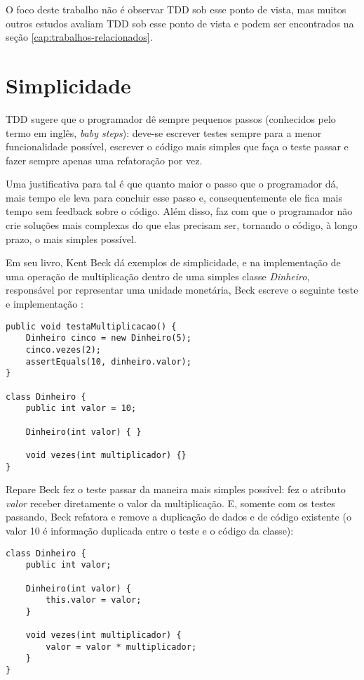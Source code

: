 O foco deste trabalho não é observar TDD sob esse ponto de vista, mas muitos
outros estudos avaliam TDD sob esse ponto de vista e podem ser encontrados na
seção \ref{cap:trabalhos-relacionados}.

\section{Simplicidade}

TDD sugere que o programador dê sempre pequenos passos (conhecidos pelo termo em
inglês, \textit{baby steps}): deve-se escrever testes sempre para a menor
funcionalidade possível, escrever o código mais simples que faça o teste passar
e fazer sempre apenas uma refatoração por vez.

Uma justificativa para tal é que quanto maior o passo que o programador dá, mais
tempo ele leva para concluir esse passo e, consequentemente ele fica mais tempo
sem feedback sobre o código. Além disso, faz com que o programador não crie
soluções mais complexas do que elas precisam ser, tornando o código, à longo
prazo, o mais simples possível.

Em seu livro, Kent Beck dá exemplos de simplicidade, e na implementação de uma
operação de multiplicação dentro de uma simples classe \textit{Dinheiro},
responsável por representar uma unidade monetária, Beck escreve o seguinte
teste e implementação \cite{TDDByExample}:

\begin{lstlisting}[frame=trbl]
public void testaMultiplicacao() {
	Dinheiro cinco = new Dinheiro(5);
	cinco.vezes(2);
	assertEquals(10, dinheiro.valor);
}
	
class Dinheiro {
	public int valor = 10;
		
	Dinheiro(int valor) { }
		
	void vezes(int multiplicador) {}
}
\end{lstlisting}

Repare Beck fez o teste passar da maneira mais simples possível: fez o atributo
\textit{valor} receber diretamente o valor da multiplicação. E, somente com os
testes passando, Beck refatora e remove a duplicação de dados e de código
existente (o valor 10 é informação duplicada entre o teste e o código da
classe):

\begin{lstlisting}[frame=trbl]
class Dinheiro {
	public int valor;
	
	Dinheiro(int valor) {
		this.valor = valor;
	}
	
	void vezes(int multiplicador) {
		valor = valor * multiplicador;
	}
}
\end{lstlisting}


